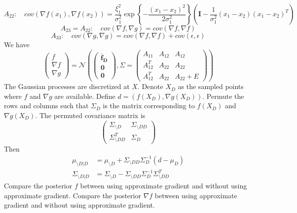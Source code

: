 \documentclass[a4paper,onecolumn]{article}
\theoremstyle{remark}
\begin{document}
\begin{equation}
    A_{22}: \quad cov(\nabla f(x_1), \nabla f(x_2)) = \frac{\xi_1^2}{\sigma_1^2}\exp\left\{
    -\frac{(x_1-x_2)^2}{2\sigma_1^2} \right\} \left(  \boldsymbol{I} -\frac{1}{\sigma_1^2}(x_1-x_2)(x_1-x_2)^T\right)
\end{equation}
\begin{equation}
    A_{23} = A_{22}: \quad cov(\nabla f, \nabla g) = cov(\nabla f, \nabla f)
\end{equation}
\begin{equation}
    A_{33}: \quad cov(\nabla g, \nabla g) = cov(\nabla f, \nabla f) + cov(\epsilon, \epsilon)
\end{equation}
We have
\begin{equation}
    \begin{pmatrix}
        f\\ \nabla f\\ \nabla g
    \end{pmatrix}
    =
    \mathcal{N}\left(
    \begin{pmatrix}
        \boldsymbol{\bar{f}_D}\\
        \boldsymbol{0}\\
        \boldsymbol{0}
    \end{pmatrix} ,
    \Sigma = 
    \begin{pmatrix}
        A_{11} & A_{12} & A_{12}\\
        A_{12}^T & A_{22} & A_{22}\\
        A_{12}^T & A_{22} & A_{22}+E
    \end{pmatrix}
    \right)
\end{equation}
The Gaussian processes are discretized at $X$. Denote $X_{D}$ as the sampled points where
$f$ and $\nabla g$ are available. 
Define $d = \left( f(X_D), \nabla g(X_D) \right)$.
Permute the rows and columns such that $\Sigma_D$ is the matrix
corresponding to $f(X_D)$ and $\nabla g(X_D)$. The permuted covariance matrix is
\begin{equation}
    \begin{pmatrix}
        \Sigma_{\setminus D} & \Sigma_{\setminus D D}\\
        \Sigma_{\setminus D D}^T & \Sigma_{D}
    \end{pmatrix}
\end{equation}
Then
\begin{equation}\begin{split}
    \mu_{\setminus D|D} &= \mu_{\setminus D} + \Sigma_{\setminus D D} \Sigma_{D}^{-1} \left(d-\mu_{D}\right)\\
    \Sigma_{\setminus D|D} &= \Sigma_{\setminus D} - \Sigma_{\setminus D D} \Sigma^{-1}_{D} \Sigma_{\setminus D D}^T
\end{split}\end{equation}
Compare the posterior $f$ between using approximate gradient and without using approximate gradient.
Compare the posterior $\nabla f$ between using approximate gradient and without using approximate gradient.
\end{document}
